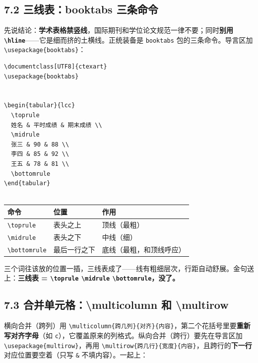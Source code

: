\subsection*{7.2 三线表：booktabs 三条命令}

先说结论：\textbf{学术表格禁竖线}，国际期刊和学位论文规范一律不要；同时\textbf{别用 \texttt{\textbackslash{}hline}}——它是细而挤的土横线。正统装备是 \texttt{booktabs} 包的三条命令。导言区加 \texttt{\textbackslash{}usepackage\{booktabs\}}：

\begin{lstlisting}
\documentclass[UTF8]{ctexart}
\usepackage{booktabs}


\begin{tabular}{lcc}
  \toprule
  姓名 & 平时成绩 & 期末成绩 \\
  \midrule
  张三 & 90 & 88 \\
  李四 & 85 & 92 \\
  王五 & 78 & 81 \\
  \bottomrule
\end{tabular}


\end{lstlisting}

\begin{table}[htbp]
\centering
\small
\begin{tabularx}{\linewidth}{@{}*{3}{>{\raggedright\arraybackslash}X}@{}}
\toprule
\textbf{命令} & \textbf{位置} & \textbf{作用} \\
\midrule
\texttt{\textbackslash{}toprule} & 表头之上 & 顶线（最粗） \\
\texttt{\textbackslash{}midrule} & 表头之下 & 中线（细） \\
\texttt{\textbackslash{}bottomrule} & 最后一行之下 & 底线（最粗，和顶线呼应） \\
\bottomrule
\end{tabularx}
\end{table}

三个词往该放的位置一插，三线表成了——线有粗细层次，行距自动舒展。金句送上：\textbf{三线表 = \texttt{\textbackslash{}toprule} \texttt{\textbackslash{}midrule} \texttt{\textbackslash{}bottomrule}，没了。}

\subsection*{7.3 合并单元格：\textbackslash{}multicolumn 和 \textbackslash{}multirow}

横向合并（跨列）用 \texttt{\textbackslash{}multicolumn\{跨几列\}\{对齐\}\{内容\}}，第二个花括号里要\textbf{重新写对齐字母}（如 \texttt{c}），它覆盖原来的列格式。纵向合并（跨行）要先在导言区加 \texttt{\textbackslash{}usepackage\{multirow\}}，再用 \texttt{\textbackslash{}multirow\{跨几行\}\{宽度\}\{内容\}}，且跨行的\textbf{下一行}对应位置要空着（只写 \texttt{\&} 不填内容）。一起上：

